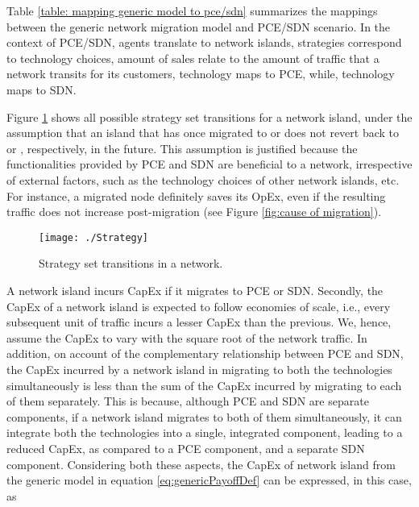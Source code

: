 \documentclass[smallextended]{svjour3}
\begin{document}
\par Table \ref{table: mapping generic model to pce/sdn} summarizes the mappings
between the generic network migration model and PCE/SDN scenario. In the context
of PCE/SDN, agents translate to network islands, strategies correspond to
technology choices, amount of sales relate to the amount of traffic that a
network transits for its customers, technology  maps to PCE, while,
technology  maps to SDN.

\par Figure \ref{fig:StrategySetTransitions} shows all
possible strategy set transitions for a network island, under the assumption that an
island that has once migrated to  or 
does not revert back to  or ,
respectively, in the future. This assumption is justified because the
functionalities provided by PCE and SDN are beneficial to a network, irrespective
of external factors, such as the technology choices of other network islands,
etc.
For instance, a migrated node definitely saves its OpEx, even if the resulting
traffic does not increase post-migration (see Figure \ref{fig:cause of migration}).

\begin{figure} [!hbt]
\begin{center}
\texttt{[image: ./Strategy]}
\label{fig:str}
\end{center}
\caption{Strategy set transitions in a network.}
\label{fig:StrategySetTransitions}
\end{figure}

\par A network island incurs CapEx if it migrates to PCE or SDN.
Secondly, the CapEx of a network island is expected to follow economies of
scale, i.e.,  every subsequent unit of traffic incurs a lesser CapEx than the
previous.
We, hence, assume the CapEx to vary with the square root of the network traffic.
In addition, on account of the complementary relationship between PCE and SDN,
the CapEx incurred by a network island in migrating to both the technologies
simultaneously is less than the sum of the CapEx incurred by migrating to each
of them separately. This is because, although PCE and SDN are separate
components, if a network island migrates to both of them simultaneously, it can
integrate both the technologies into a single, integrated component, leading to
a reduced CapEx, as compared to a PCE component, and a separate SDN component.
Considering both these aspects, the CapEx of network island  from the
generic model in equation \eqref{eq:genericPayoffDef} can be expressed, in this case, as
\end{document}

